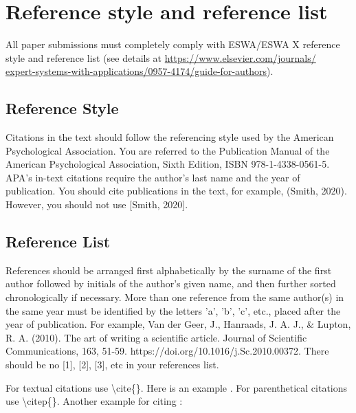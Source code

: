 \documentclass[review]{elsarticle}
\begin{document}
	\section{Reference style and reference list}
	\label{reference_style}
	
	All paper submissions must completely comply with ESWA/ESWA X reference style and reference list (see details at
	\href{https://www.elsevier.com/journals/expert-systems-with-applications/0957-4174/guide-for-authors}{https://www.elsevier.com/journals/\\expert-systems-with-applications/0957-4174/guide-for-authors}).
	
	\subsection{Reference Style}
	Citations in the text should follow the referencing style used by the American Psychological Association. You are referred to the Publication Manual of the American Psychological Association, Sixth Edition, ISBN 978-1-4338-0561-5.  APA's in-text citations require the author's last name and the year of publication. You should cite publications in the text, for example, (Smith, 2020).  However, you should not use [Smith, 2020].
	
	\subsection{Reference List}
	References should be arranged first alphabetically by the surname of the first author followed by initials of the author's given name, and then further sorted chronologically if necessary. More than one reference from the same author(s) in the same year must be identified by the letters 'a', 'b', 'c', etc., placed after the year of publication. For example, Van der Geer, J., Hanraads, J. A. J., \& Lupton, R. A. (2010). The art of writing a scientific article. Journal of Scientific Communications, 163, 51-59. https://doi.org/10.1016/j.Sc.2010.00372. There should be no [1], [2], [3], etc in your references list.
	
	
	For textual citations use \textbackslash cite\{\}. Here is an example \cite{Feynman1963118,Dirac1953888}. For parenthetical citations use \textbackslash citep\{\}. Another example for citing \citep{Smith2012qr,Smith2013jd,art}: 
	
	
\end{document}

